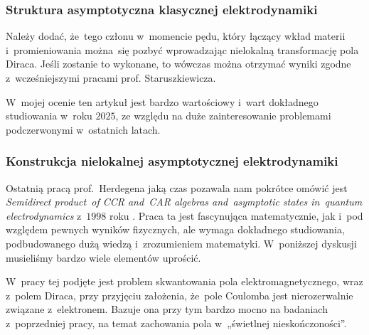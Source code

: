 \documentclass[10pt,t]{beamer}
\begin{document}
\begin{frame}
  \frametitle{Struktura asymptotyczna klasycznej elektrodynamiki}


  Należy dodać, że~tego członu w~momencie pędu, który łączący wkład materii
  i~promieniowania można~się pozbyć wprowadzając nielokalną transformację
  pola Diraca. Jeśli zostanie to wykonane, to wówczas można otrzymać wyniki
  zgodne z~wcześniejszymi pracami prof. Staruszkiewicza.




  W~mojej ocenie ten artykuł jest bardzo wartościowy i~wart dokładnego
  studiowania w~roku $2025$, ze względu na duże zainteresowanie problemami
  podczerwonymi w~ostatnich latach.

\end{frame}





\begin{frame}
  \frametitle{Konstrukcja nielokalnej asymptotycznej
    elektrodynamiki}


  Ostatnią pracą prof.~Herdegena jaką czas pozawala nam pokrótce omówić
  jest 
  {\textit{Semidirect product~of CCR and~CAR algebras and~asymptotic states
      in~quantum electrodynamics}} z~$1998$ roku
  \parencite{Herdegen-Semidirect-product-of-CCR-and-CAR-algebras-ETC-Pub-1998}.
  Praca ta jest fascynująca matematycznie,
  jak i~pod względem pewnych wyników fizycznych, ale wymaga dokładnego
  studiowania, podbudowanego dużą wiedzą i~zrozumieniem matematyki.
  W~poniższej dyskusji musieliśmy bardzo wiele elementów uprościć.

  W~pracy tej podjęte jest problem skwantowania pola elektromagnetycznego,
  wraz z~polem Diraca, przy przyjęciu założenia, że~pole Coulomba jest
  nierozerwalnie związane z~elektronem. Bazuje ona przy tym bardzo mocno
  na badaniach z~poprzedniej pracy, na temat zachowania pola
  w~„świetlnej nieskończoności”.

\end{frame}
\end{document}
